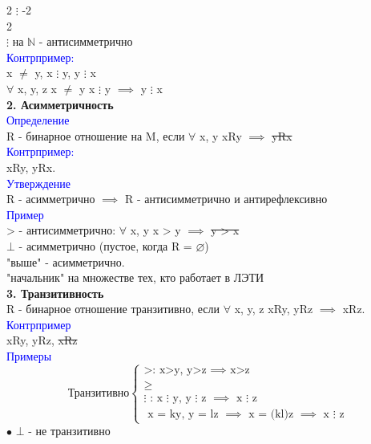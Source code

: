 \documentclass[a4paper,12pt]{article}   %
\begin{document}
2 $\vdots$ -2 \\
2  \\
$\vdots$ на $\mathbb{N}$ - антисимметрично \\
\textcolor{blue}{Контрпример:} \\
x $\neq$ y,  x $\vdots$ y,  y $\vdots$ x \\
$\forall$ x, y, z  x $\neq$ y  x $\vdots$ y $\implies$ y \sout{$\vdots$} x\\
\textbf{2. Асимметричность} \\
\textcolor{blue}{Определение} \\
R - бинарное отношение на M, если $\forall$ x, y xRy $\implies$ \sout{yRx} \\
\textcolor{blue}{Контрпример:} \\
xRy, yRx. \\
\textcolor{blue}{Утверждение} \\
R - асимметрично $\implies$ R - антисимметрично и антирефлексивно \\
\textcolor{blue}{Пример} \\
> - антисимметрично: $\forall$ x, y x > y $\implies$ \sout{y > x} \\
$\bot$ - асимметрично (пустое, когда R  = $\varnothing$)\\
"выше" - асимметрично. \\
"начальник" на множестве тех, кто работает в ЛЭТИ \\
\textbf{3. Транзитивность} \\
R - бинарное отношение транзитивно, если $\forall$ x, y, z xRy, yRz $\implies$ xRz. \\
\textcolor{blue}{Контрпример} \\
xRy, yRz, \sout{xRz} \\
\textcolor{blue}{Примеры} 
\begin{equation*} %
\text{Транзитивно} 
 \begin{cases}
   \text{>: x>y, y>z $\implies$ x>z}\\
   \geqslant \\
   \text{$\vdots$ : x $\vdots$ y, y $\vdots$ z $\implies$ x $\vdots$ z} \\
   \text{  x = ky, y = lz $\implies$ x = (kl)z $\implies$ x $\vdots$ z}
 \end{cases}
\end{equation*} %
$\bullet$ $\bot$ - не транзитивно \\
 \\  %
\end{document}
